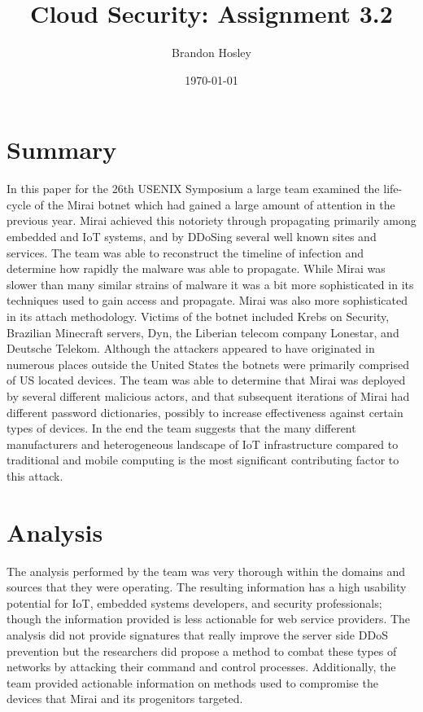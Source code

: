 \documentclass[]{article}
\title{Cloud Security: Assignment 3.2}
\author{Brandon Hosley}
\date{\today}
\begin{document}
	\maketitle
	
\section{Summary} 

In this paper\cite{Mirai2017} for the 26th USENIX Symposium a large team examined the life-cycle of the Mirai botnet which had gained a large amount of attention in the previous year.
Mirai achieved this notoriety through propagating primarily among embedded and IoT systems, and by DDoSing several well known sites and services.
The team was able to reconstruct the timeline of infection and determine how rapidly the malware was able to propagate. 
While Mirai was slower than many similar strains of malware it was a bit more sophisticated in its techniques used to gain access and propagate.
Mirai was also more sophisticated in its attach methodology.
Victims of the botnet included Krebs on Security, Brazilian Minecraft servers, Dyn, the Liberian telecom company Lonestar, and Deutsche Telekom.
Although the attackers appeared to have originated in numerous places outside the United States the botnets were primarily comprised of US located devices.
The team was able to determine that Mirai was deployed by several different malicious actors, 
and that subsequent iterations of Mirai had different password dictionaries, possibly to increase effectiveness against certain types of devices.
In the end the team suggests that the many different manufacturers and heterogeneous landscape of IoT infrastructure compared to traditional and mobile computing is the most significant contributing factor to this attack.

\section{Analysis}

The analysis performed by the team was very thorough within the domains and sources that they were operating.
The resulting information has a high usability potential for IoT, embedded systems developers, and security professionals;
though the information provided is less actionable for web service providers.
The analysis did not provide signatures that really improve the server side DDoS prevention but the researchers did propose a method to combat these types of networks by attacking their command and control processes.
Additionally, the team provided actionable information on methods used to compromise the devices that Mirai and its progenitors targeted.


\clearpage


\end{document}
